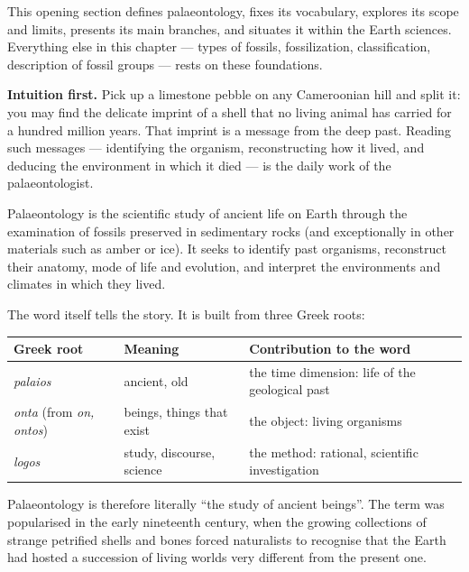 \documentclass[11pt]{article}
\newcommand{\cle}[1]{{\popxbold\color{popdark}#1}}
\newcounter{popsec}
\newcounter{popsub}
\newcommand{\courssub}[1]{%
  \stepcounter{popsub}%
  \par\vspace{9pt}\noindent{\popxbold\fontsize{11.5}{13}\selectfont\color{popink}{\color{poporange}\thepopsec.\thepopsub}\hspace{6pt}#1}\par\nopagebreak\vspace{4pt}
}
\begin{document}
This opening section defines palaeontology, fixes its vocabulary, explores its scope and limits, presents its main branches, and situates it within the Earth sciences. Everything else in this chapter --- types of fossils, fossilization, classification, description of fossil groups --- rests on these foundations.

\courssub{What is Palaeontology?}

\textbf{Intuition first.} Pick up a limestone pebble on any Cameroonian hill and split it: you may find the delicate imprint of a shell that no living animal has carried for a hundred million years. That imprint is a message from the deep past. Reading such messages --- identifying the organism, reconstructing how it lived, and deducing the environment in which it died --- is the daily work of the palaeontologist.

\begin{definition}[Palaeontology]
\cle{Palaeontology} is the scientific study of ancient life on Earth through the examination of \cle{fossils} preserved in sedimentary rocks (and exceptionally in other materials such as amber or ice). It seeks to identify past organisms, reconstruct their anatomy, mode of life and evolution, and interpret the environments and climates in which they lived.
\end{definition}

The word itself tells the story. It is built from three Greek roots:

\begin{center}
\begin{tabularx}{\linewidth}{|l|l|X|}
\hline
\rowcolor{popblueL} \textbf{Greek root} & \textbf{Meaning} & \textbf{Contribution to the word} \\
\hline
\textit{palaios} & ancient, old & the time dimension: life of the geological past \\
\hline
\textit{onta} (from \textit{on, ontos}) & beings, things that exist & the object: living organisms \\
\hline
\textit{logos} & study, discourse, science & the method: rational, scientific investigation \\
\hline
\end{tabularx}
\end{center}

Palaeontology is therefore literally ``the study of ancient beings''. The term was popularised in the early nineteenth century, when the growing collections of strange petrified shells and bones forced naturalists to recognise that the Earth had hosted a succession of living worlds very different from the present one.
\end{document}
